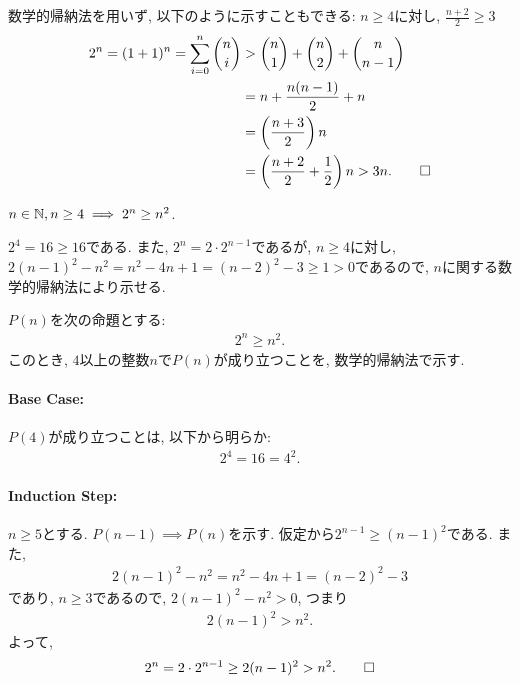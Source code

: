 \begin{rem}
  数学的帰納法を用いず, 以下のように示すこともできる:
  $n\geq 4$に対し, $\frac{n+2}{2}\geq 3$
  \begin{align*}
    2^n=(1+1)^n=\sum_{i=0}^n \binom{n}{i}
    &> \binom{n}{1}+\binom{n}{2}+\binom{n}{n-1}\\
    &=n+\frac{n(n-1)}{2}+n\\
    &=\left(\frac{n+3}{2}\right)n\\
    &=\left(\frac{n+2}{2}+\frac{1}{2}\right)n
    > 3n
    .\qedhere
  \end{align*}
\end{rem}


\begin{prop}
  \label{p:20230815}
  $n\in\mathbb{N}, n\geq 4\implies 2^n\geq n^2$.
\end{prop}
\begin{proof**}
  $2^4=16\geq 16$である.
  また,
  $2^n=2\cdot 2^{n-1}$であるが,
  $n\geq 4$に対し,
  $2(n-1)^2-n^2=n^2-4n+1=(n-2)^2-3\geq 1>0$であるので,
  $n$に関する数学的帰納法により示せる.
\end{proof**}
\begin{proof*}
  $P(n)$を次の命題とする:
  \begin{align*}
    2^n\geq n^2
    .
  \end{align*}
  このとき,
  $4$以上の整数$n$で$P(n)$が成り立つことを,
  数学的帰納法で示す.

  \paragraph{Base Case:}
  $P(4)$が成り立つことは, 以下から明らか:
  \begin{align*}
    2^4=16=4^2.
  \end{align*}
  \paragraph{Induction Step:}
  $n\geq 5$とする.
  $P(n-1)\implies P(n)$を示す.
  仮定から$2^{n-1}\geq (n-1)^2$である.
  また,
  \begin{align*}
    2(n-1)^2-n^2=n^2-4n+1=(n-2)^2-3
  \end{align*}
  であり,
  $n\geq 3$であるので,
  $2(n-1)^2-n^2>0$, つまり
  \begin{align*}
    2(n-1)^2>n^2.
  \end{align*}
  よって,
  \begin{align*}
    2^n=2\cdot 2^{n-1}\geq 2(n-1)^2>n^2
    .\qedhere
  \end{align*}
\end{proof*}


